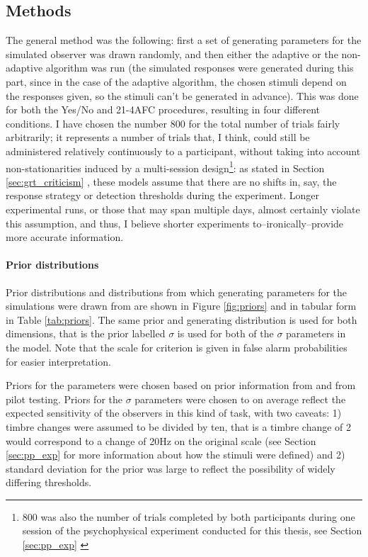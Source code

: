\documentclass{article}\usepackage{knitr}
\begin{document}
\subsection{Methods}

The general method was the following: first a set of generating parameters for the simulated observer was drawn randomly, and then either the adaptive or the non-adaptive algorithm was run (the simulated responses were generated during this part, since in the case of the adaptive algorithm, the chosen stimuli depend on the responses given, so the stimuli can't be generated in advance). This was done for both the Yes/No and 21-4AFC procedures, resulting in four different conditions. I have chosen the number 800 for the total number of trials fairly arbitrarily; it represents a number of trials that, I think, could still be administered relatively continuously to a participant, without taking into account non-stationarities induced by a multi-session design\footnote{800 was also the number of trials completed by both participants during one session of the psychophysical experiment conducted for this thesis, see Section \ref{sec:pp_exp} \textit{}}: as stated in Section \ref{sec:grt_criticism} \textit{}, these models assume that there are no shifts in, say, the response strategy or detection thresholds during the experiment. Longer experimental runs, or those that may span multiple days, almost certainly violate this assumption, and thus, I believe shorter experiments to--ironically--provide more accurate information. 

\paragraph{Prior distributions}

Prior distributions and distributions from which generating parameters for the simulations were drawn from are shown in Figure \ref{fig:priors} and in tabular form in Table \ref{tab:priors}. The same prior and generating distribution is used for both dimensions, that is the prior labelled $\sigma$ is used for both of the $\sigma$ parameters in the model. Note that the scale for criterion is given in false alarm probabilities for easier interpretation. 

Priors for the parameters were chosen based on prior information from \citet{silbert2009, dai2011} and from pilot testing. Priors for the $\sigma$ parameters were chosen to on average reflect the expected sensitivity of the observers in this kind of task, with two caveats: 1) timbre changes were assumed to be divided by ten, that is a timbre change of 2 would correspond to a change of 20Hz on the original scale (see Section \ref{sec:pp_exp} \textit{} for more information about how the stimuli were defined) and 2) standard deviation for the prior was large to reflect the possibility of widely differing thresholds.
\end{document}
